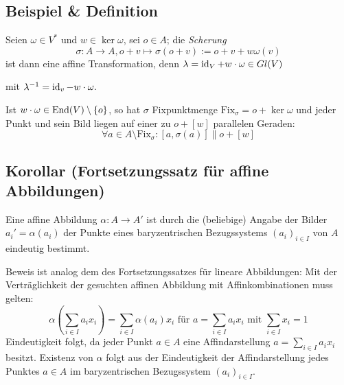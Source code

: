 \subsection{Beispiel \& Definition}
	\begin{Definition}[Scherung]
	Seien $ \omega\in V^* $ und $ w\in \ker \omega $, sei $ o\in A $; die \emph{Scherung}
		\[ \sigma:A\to A, o+v\mapsto \sigma(o+v):= o+v+w\omega(v) \]
	ist dann eine affine Transformation, denn\hfill
		$ \lambda = \operatorname{id}_V + w\cdot \omega \in Gl(V) $
		
	mit\hfill
		$ \lambda^{-1} = \operatorname{id}_v - w\cdot \omega. $
	
	Ist $ w\cdot\omega\in\operatorname{End}(V)\setminus\{o\} $, so hat $ \sigma $ Fixpunktmenge $ \text{Fix}_\sigma = o+\ker\omega $ und jeder Punkt und sein Bild liegen auf einer zu $ o+[w] $ parallelen Geraden:
		\[ \forall a\in A\setminus \text{Fix}_\sigma : [a,\sigma(a)] \parallel o+[w] \]
	\end{Definition}

\subsection{Korollar (Fortsetzungssatz für affine Abbildungen)}
	\begin{Korollar}
		Eine affine Abbildung $ \alpha:A\to A' $ ist durch die (beliebige) Angabe der Bilder $ a_i' = \alpha(a_i) $ der Punkte eines baryzentrischen Bezugssystems $ (a_i)_{i\in I} $ von $ A $ eindeutig bestimmt.
	\end{Korollar}
	Beweis ist analog dem des Fortsetzungssatzes für lineare Abbildungen: Mit der Verträglichkeit der gesuchten affinen Abbildung mit Affinkombinationen muss gelten:
		\[ \alpha\left(\sum_{i\in I}a_ix_i\right)=\sum_{i\in I}\alpha(a_i)x_i \text{ für } a =\sum_{i\in I}a_ix_i \text{ mit } \sum_{i\in I}x_i = 1 \]
	Eindeutigkeit folgt, da jeder Punkt $ a\in A $ eine Affindarstellung $ a = \sum_{i\in I}a_ix_i $ besitzt. Existenz von $ \alpha $ folgt aus der Eindeutigkeit der Affindarstellung jedes Punktes $ a\in A $ im baryzentrischen Bezugssystem $ (a_i)_{i\in I} $.
	

